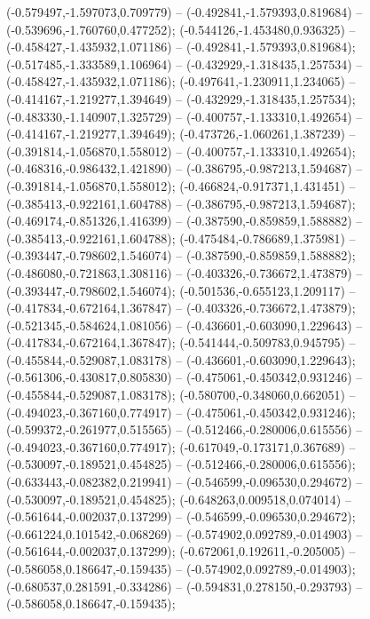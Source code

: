  (-0.579497,-1.597073,0.709779) -- (-0.492841,-1.579393,0.819684) -- (-0.539696,-1.760760,0.477252);
 (-0.544126,-1.453480,0.936325) -- (-0.458427,-1.435932,1.071186) -- (-0.492841,-1.579393,0.819684);
 (-0.517485,-1.333589,1.106964) -- (-0.432929,-1.318435,1.257534) -- (-0.458427,-1.435932,1.071186);
 (-0.497641,-1.230911,1.234065) -- (-0.414167,-1.219277,1.394649) -- (-0.432929,-1.318435,1.257534);
 (-0.483330,-1.140907,1.325729) -- (-0.400757,-1.133310,1.492654) -- (-0.414167,-1.219277,1.394649);
 (-0.473726,-1.060261,1.387239) -- (-0.391814,-1.056870,1.558012) -- (-0.400757,-1.133310,1.492654);
 (-0.468316,-0.986432,1.421890) -- (-0.386795,-0.987213,1.594687) -- (-0.391814,-1.056870,1.558012);
 (-0.466824,-0.917371,1.431451) -- (-0.385413,-0.922161,1.604788) -- (-0.386795,-0.987213,1.594687);
 (-0.469174,-0.851326,1.416399) -- (-0.387590,-0.859859,1.588882) -- (-0.385413,-0.922161,1.604788);
 (-0.475484,-0.786689,1.375981) -- (-0.393447,-0.798602,1.546074) -- (-0.387590,-0.859859,1.588882);
 (-0.486080,-0.721863,1.308116) -- (-0.403326,-0.736672,1.473879) -- (-0.393447,-0.798602,1.546074);
 (-0.501536,-0.655123,1.209117) -- (-0.417834,-0.672164,1.367847) -- (-0.403326,-0.736672,1.473879);
 (-0.521345,-0.584624,1.081056) -- (-0.436601,-0.603090,1.229643) -- (-0.417834,-0.672164,1.367847);
 (-0.541444,-0.509783,0.945795) -- (-0.455844,-0.529087,1.083178) -- (-0.436601,-0.603090,1.229643);
 (-0.561306,-0.430817,0.805830) -- (-0.475061,-0.450342,0.931246) -- (-0.455844,-0.529087,1.083178);
 (-0.580700,-0.348060,0.662051) -- (-0.494023,-0.367160,0.774917) -- (-0.475061,-0.450342,0.931246);
 (-0.599372,-0.261977,0.515565) -- (-0.512466,-0.280006,0.615556) -- (-0.494023,-0.367160,0.774917);
 (-0.617049,-0.173171,0.367689) -- (-0.530097,-0.189521,0.454825) -- (-0.512466,-0.280006,0.615556);
 (-0.633443,-0.082382,0.219941) -- (-0.546599,-0.096530,0.294672) -- (-0.530097,-0.189521,0.454825);
 (-0.648263,0.009518,0.074014) -- (-0.561644,-0.002037,0.137299) -- (-0.546599,-0.096530,0.294672);
 (-0.661224,0.101542,-0.068269) -- (-0.574902,0.092789,-0.014903) -- (-0.561644,-0.002037,0.137299);
 (-0.672061,0.192611,-0.205005) -- (-0.586058,0.186647,-0.159435) -- (-0.574902,0.092789,-0.014903);
 (-0.680537,0.281591,-0.334286) -- (-0.594831,0.278150,-0.293793) -- (-0.586058,0.186647,-0.159435);
